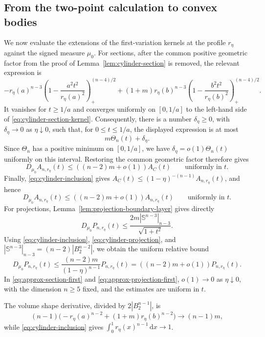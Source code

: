 \documentclass[11pt]{article}
\theoremstyle{remark}
\newcommand{\Sph}{\mathbb{S}}
\newcommand{\dd}{\,\mathrm{d}}
\newcommand{\pos}[1]{(#1)_{+}}
\begin{document}
\subsection{From the two-point calculation to convex bodies}

We now evaluate the extensions of the first-variation kernels at the
profile $r_\eta$ against the signed measure $\mu_0$.  For sections, after
the common positive geometric factor from the proof of
Lemma~\ref{lem:cylinder-section} is removed, the relevant expression is
\[
 -r_\eta(a)^{n-3}
  \pos{1-\frac{a^2t^2}{r_\eta(a)^2}}^{(n-4)/2}
 +(1+m) r_\eta(b)^{n-3}
  \pos{1-\frac{b^2t^2}{r_\eta(b)^2}}^{(n-4)/2}.
\]
It vanishes for $t\geq1/a$ and converges uniformly on $[0,1/a]$ to the
left-hand side of \eqref{eq:cylinder-section-kernel}.  Consequently, there
is a number $\delta_\eta\geq0$, with $\delta_\eta\to0$ as
$\eta\downarrow0$, such that, for $0\leq t\leq1/a$, the displayed
expression is at most
\[
 m\Theta_n(t)+\delta_\eta.
\]
Since $\Theta_n$ has a positive minimum on $[0,1/a]$, we have
$\delta_\eta=o(1)\Theta_n(t)$ uniformly on this interval.  Restoring the common
geometric factor therefore gives
\[
 D_{\mu_0}A_{n,r_\eta}(t)
 \leq\left((n-2)m+o(1)\right)A_C(t)
 \qquad\text{uniformly in }t.
\]
Finally, \eqref{eq:cylinder-inclusion} gives
$A_C(t)\leq(1-\eta)^{-(n-1)}A_{n,r_\eta}(t)$, and hence
\begin{equation}\label{eq:approx-section-first}
 D_{\mu_0}A_{n,r_\eta}(t)
 \leq\left((n-2)m+o(1)\right)A_{n,r_\eta}(t)
 \qquad\text{uniformly in }t.
\end{equation}
For projections, Lemma~\ref{lem:projection-boundary-layer} gives directly
\[
 D_{\mu_0}P_{n,r_\eta}(t)
 \leq\frac{2m|\Sph^{n-3}|_{n-3}}{\sqrt{1+t^2}}.
\]
Using \eqref{eq:cylinder-inclusion},
\eqref{eq:cylinder-projection}, and
$|\Sph^{n-3}|_{n-3}
=(n-2)|B_2^{n-2}|$, we obtain the uniform relative bound
\begin{equation}\label{eq:approx-projection-first}
 D_{\mu_0}P_{n,r_\eta}(t)
 \leq\frac{(n-2)m}{(1-\eta)^{n-1}}
       P_{n,r_\eta}(t)
 =\left((n-2)m+o(1)\right)P_{n,r_\eta}(t).
\end{equation}
In \eqref{eq:approx-section-first} and
\eqref{eq:approx-projection-first}, $o(1)\to0$ as $\eta\downarrow0$, with
the dimension $n\geq5$ fixed, and the estimates are uniform in $t$.

The volume shape derivative, divided by
$2|B_2^{n-1}|$, is
\[
 (n-1)\bigl(-r_\eta(a)^{n-2}
               +(1+m)r_\eta(b)^{n-2}\bigr)
 \longrightarrow(n-1)m,
\]
while \eqref{eq:cylinder-inclusion} gives
$\int_0^1r_\eta(x)^{n-1}\dd x\to1$.
\end{document}
